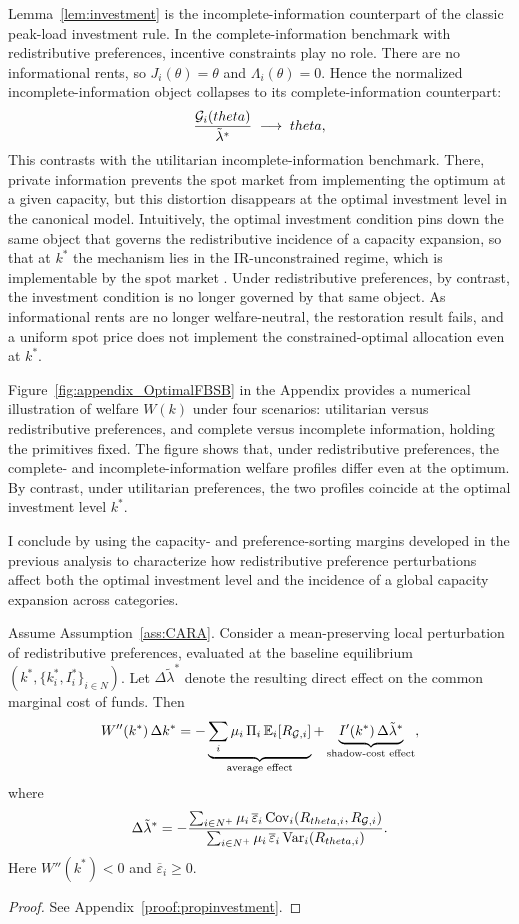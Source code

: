 \documentclass{class}
\begin{document}
Lemma~\ref{lem:investment} is the incomplete-information counterpart of the classic peak-load investment rule. In the complete-information benchmark with redistributive preferences, incentive constraints play no role. There are no informational rents, so \(J_i(\theta)=\theta\) and \(\Lambda_i(\theta)=0\). Hence the normalized incomplete-information object collapses to its complete-information counterpart:
\[
\frac{\mathcal{G}_i(theta)}{\tilde\lambda^\ast}
\;\longrightarrow\;
theta,
\]
This contrasts with the utilitarian incomplete-information benchmark. There, private information prevents the spot market from implementing the optimum at a given capacity, but this distortion disappears at the optimal investment level in the canonical model. Intuitively, the optimal investment condition pins down the same object that governs the redistributive incidence of a capacity expansion, so that at \(k^\ast\) the mechanism lies in the IR-unconstrained regime, which is implementable by the spot market \citep{spulber1992optimal,chao1987priority}. Under redistributive preferences, by contrast, the investment condition is no longer governed by that same object. As informational rents are no longer welfare-neutral, the restoration result fails, and a uniform spot price does not implement the constrained-optimal allocation even at \(k^\ast\).

Figure~\ref{fig:appendix_OptimalFBSB} in the Appendix provides a numerical illustration of welfare \(W(k)\) under four scenarios: utilitarian versus redistributive preferences, and complete versus incomplete information, holding the primitives fixed. The figure shows that, under redistributive preferences, the complete- and incomplete-information welfare profiles differ even at the optimum. By contrast, under utilitarian preferences, the two profiles coincide at the optimal investment level \(k^\ast\).

I conclude by using the capacity- and preference-sorting margins developed in the previous analysis to characterize how redistributive preference perturbations affect both the optimal investment level and the incidence of a global capacity expansion across categories.

\begin{proposition}\label{prop:investment}
Assume Assumption~\ref{ass:CARA}. Consider a mean-preserving local perturbation
of redistributive preferences, evaluated at the baseline equilibrium
\((k^\ast,\{k_i^\ast,I_i^\ast\}_{i\in N})\). Let \(\Delta\tilde\lambda^\ast\) denote
the resulting direct effect on the common marginal cost of funds. Then
\[
W''(k^\ast)\,\Delta k^\ast
=
-\underbrace{\sum_i\mu_i\,\Pi_i\,\mathbb{E}_i[R_{\mathcal{G},i}]}_{\text{average effect}}
+
\underbrace{I'(k^\ast)\,\Delta\tilde\lambda^\ast}_{\text{shadow-cost effect}},
\]
where
\[
\Delta\tilde\lambda^\ast
=
-
\frac{
\sum_{i\in N^+}\mu_i\,\overline\varepsilon_i\,
\mathrm{Cov}_i\!\left(R_{theta,i},R_{\mathcal{G},i}\right)
}{
\sum_{i\in N^+}\mu_i\,\overline\varepsilon_i\,
\mathrm{Var}_i\!\left(R_{theta,i}\right)
}.
\]
Here \(W''(k^\ast)<0\) and \(\overline\varepsilon_i \geq 0\).
\end{proposition}
\begin{proof}
See Appendix~\ref{proof:propinvestment}.
\end{proof}
\end{document}
